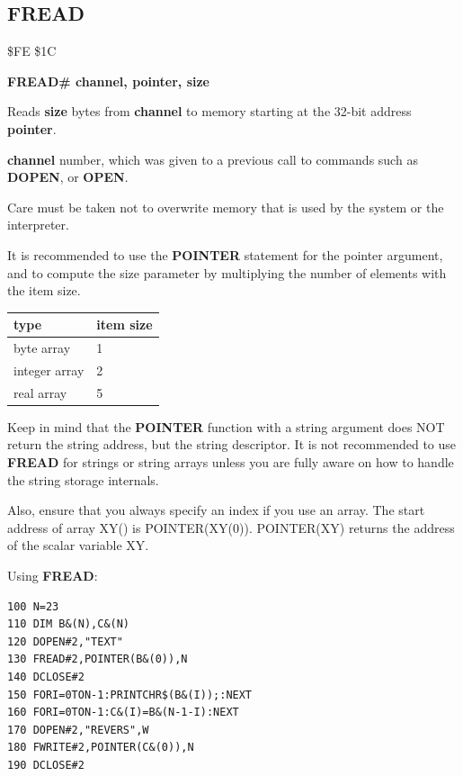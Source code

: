 \subsection{FREAD}
\begin{description}[leftmargin=2cm,style=nextline]
\item [Token:] \$FE \$1C
\item [Format:] {\bf FREAD\# channel, pointer, size}
\item [Usage:] Reads {\bf size} bytes from {\bf channel} to memory
               starting at the 32-bit address {\bf pointer}.

               {\bf channel} number, which was given to a previous
               call to commands such as {\bf DOPEN}, or {\bf OPEN}.


               Care must be taken not to overwrite memory
               that is used by the system or the interpreter.

               It is recommended to use the {\bf POINTER} statement
               for the pointer argument, and to compute the size parameter
               by multiplying the number of elements with the item size.
\begin{center}
\label{freadtable}
{\ttfamily
\setlength{\tabcolsep}{1mm}
\begin{tabular}{|l|l|}
\hline
 type          & item size \\
\hline
byte     array &  1     \\
integer  array &  2     \\
real     array &  5     \\
\hline
\end{tabular}
}
\end{center}

Keep in mind that the {\bf POINTER} function with a string argument
does NOT return the string address, but the string descriptor.
It is not recommended to use {\bf FREAD} for strings or string arrays
unless you are fully aware on how to handle the string storage internals.

Also, ensure that you always specify an index if you use an array.
The start address of array XY() is POINTER(XY(0)).
POINTER(XY) returns the address of the scalar variable XY.

\item [Example:] Using {\bf FREAD}:
\begin{tcolorbox}[colback=black,coltext=white]
\verbatimfont{\codefont}
\begin{verbatim}
100 N=23
110 DIM B&(N),C&(N)
120 DOPEN#2,"TEXT"
130 FREAD#2,POINTER(B&(0)),N
140 DCLOSE#2
150 FORI=0TON-1:PRINTCHR$(B&(I));:NEXT
160 FORI=0TON-1:C&(I)=B&(N-1-I):NEXT
170 DOPEN#2,"REVERS",W
180 FWRITE#2,POINTER(C&(0)),N
190 DCLOSE#2
\end{verbatim}
\end{tcolorbox}
\end{description}

